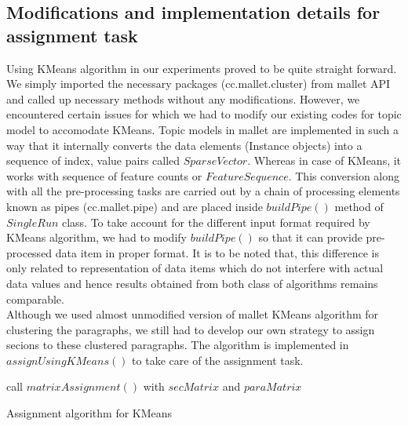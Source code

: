 \subsection{Modifications and implementation details for assignment task}
Using KMeans algorithm in our experiments proved to be quite straight forward. We simply imported the necessary packages (cc.mallet.cluster) from mallet API and called up necessary methods without any modifications. However, we encountered certain issues for which we had to modify our existing codes for topic model to accomodate KMeans. Topic models in mallet are implemented in such a way that it internally converts the data elements (Instance objects) into a sequence of index, value pairs called $SparseVector$. Whereas in case of KMeans, it works with sequence of feature counts or $FeatureSequence$. This conversion along with all the pre-processing tasks are carried out by a chain of processing elements known as pipes (cc.mallet.pipe) and are placed inside $buildPipe()$ method of $SingleRun$ class. To take account for the different input format required by KMeans algorithm, we had to modify $buildPipe()$ so that it can provide pre-processed data item in proper format. It is to be noted that, this difference is only related to representation of data items which do not interfere with actual data values and hence results obtained from both class of algorithms remains comparable. \\
Although we used almost unmodified version of mallet KMeans algorithm for clustering the paragraphs, we still had to develop our own strategy to assign secions to these clustered paragraphs. The algorithm is implemented in $assignUsingKMeans()$ to take care of the assignment task.
\begin{algorithm}[htp]
\label{algo:kmeansAssign}
 \SetAlgoLined\DontPrintSemicolon
 call $matrixAssignment()$ with $secMatrix$ and $paraMatrix$\;
 \caption{Assignment algorithm for KMeans}
\end{algorithm}
